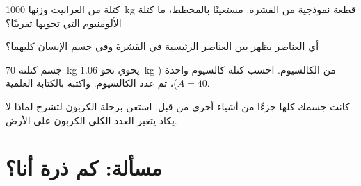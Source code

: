 \begin{exercise}[$\star\star$]\label{exo:g9:elements-universe-earth:9}
كتلة من الغرانيت وزنها \qty{1000}{kg} قطعة نموذجية من القشرة. مستعينًا
بالمخطط، ما كتلة الألومنيوم التي تحويها تقريبًا؟
\end{exercise}

\begin{exercise}[$\star\star$]\label{exo:g9:elements-universe-earth:10}
أي العناصر يظهر بين العناصر الرئيسية في القشرة وفي جسم الإنسان
كليهما؟
\end{exercise}

\begin{exercise}[$\star\star\star$]\label{exo:g9:elements-universe-earth:11}
جسم كتلته \qty{70}{kg} يحوي نحو \qty{1.06}{kg} من الكالسيوم. احسب
كتلة  كالسيوم واحدة ($A = 40$)، ثم عدد  الكالسيوم.
واكتبه بالكتابة العلمية.
\end{exercise}

\begin{exercise}[$\star\star\star$]\label{exo:g9:elements-universe-earth:12}
كانت  جسمك كلها جزءًا من أشياء أخرى من قبل. استعن برحلة 
الكربون لتشرح لماذا لا يكاد يتغير العدد الكلي  الكربون على
الأرض.
\end{exercise}

\section{مسألة: كم ذرة أنا؟}

